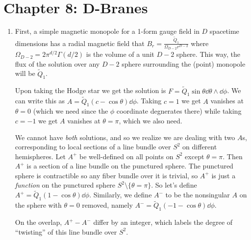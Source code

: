 \documentclass[11pt, class=article, crop=false]{standalone}
\begin{document}
\section{Chapter 8: D-Branes} %
\label{sec:chapter_8_d_branes}

\begin{enumerate}
	\item First, a simple magnetic monopole for a 1-form gauge field in $D$ spacetime dimensions has a radial magnetic field that $B_r = \frac{\tilde Q_1}{\Omega_{D-2} r^{D-2}}$ where $\Omega_{D-2} = 2 \pi^{d/2} \Gamma(d/2)$ is the volume of a unit $D-2$ sphere. This way, the flux of the solution over any $D-2$ sphere surrounding the (point) monopole will be $\tilde Q_1$.
	
	Upon taking the Hodge star we get the solution is $F = \tilde Q_1 \sin \theta \dd \theta \wedge \dd \phi$. We can write this as $A = \tilde Q_1 (c - \cos \theta) \dd \phi$. Taking $c = 1$ we get $A$ vanishes at $\theta = 0$ (which we need since the $\phi$ coordinate degnerates there) while taking $c = -1$ we get $A$ vanishes at $\theta = \pi$, which we also need.
	
	We cannot have \emph{both} solutions, and so we realize we are dealing with two $A$s, corresponding to local sections of a line bundle over $S^2$ on different hemispheres. Let $A^+$ be well-defined on all points on $S^2$ except $\theta = \pi$. Then $A^+$ is a section of a line bundle on the punctured sphere. The punctured sphere is contractible so any fiber bundle over it is trivial, so $A^+$ is just a \emph{function} on the punctured sphere $S^2 \setminus \{\theta = \pi\}$. So let's define $A^+ = \tilde Q_1 (1- \cos \theta) \dd \phi$. Similarly, we define $A^-$ to be the nonsingular $A$ on the sphere with $\theta = 0$ removed, namely $A^- = \tilde Q_1 (-1 -\cos \theta) \dd \phi$. 
	
	On the overlap, $A^+ - A^-$ differ by an integer, which labels the degree of ``twisting'' of this line bundle over $S^2$. 
	

\end{enumerate}
\end{document}
